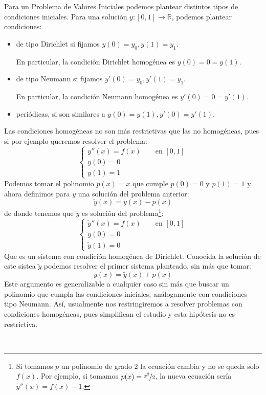 \noindent
Para un Problema de Valores Iniciales podemos plantear distintos tipos de condiciones iniciales. Para una solución $y:[0,1]\to \mathbb{R}$, podemos plantear condiciones:
\begin{itemize}
    \item de tipo Dirichlet si fijamos $y(0) = y_0, y(1) = y_1$.

        En particular, la condición Dirichlet homogénea es $y(0) = 0 = y(1)$.
    \item de tipo Neumann si fijamos $y'(0) = y_0, y'(1) = y_1$.

        En particular, la condición Neumann homogénea es $y'(0) = 0 = y'(1)$.

    \item periódicas, si son similares a $y(0) = y(1), y'(0) = y'(1)$.
\end{itemize}

\begin{observacion}
    Las condiciones homogéneas no son más restrictivas que las no homogéneas, pues si por ejemplo queremos resolver el problema:
    \begin{equation*}
        \left\{\begin{array}{l}
            y''(x) = f(x) \qquad \text{en\ } [0,1] \\
            y(0) = 0 \\
            y(1) = 1
        \end{array}\right.
    \end{equation*}
    Podemos tomar el polinomio $p(x) = x$ que cumple $p(0) = 0$ y $p(1) = 1$ y ahora definimos para $y$ una solución del problema anterior:
    \begin{equation*}
        \tilde{y}(x) = y(x) - p(x)
    \end{equation*}
    de donde tenemos que $\tilde{y}$ es solución del problema\footnote{Si tomamos $p$ un polinomio de grado 2 la ecuación cambia y no se queda solo $f(x)$. Por ejemplo, si tomamos $p(x) = \nicefrac{x^2}{2}$, la nueva ecuación sería $\tilde{y}''(x) = f(x)-1$.}:
    \begin{equation*}
        \left\{\begin{array}{l}
            \tilde{y}''(x) = f(x) \qquad \text{en\ } [0,1] \\
            \tilde{y}(0) = 0 \\
            \tilde{y}(1) = 0 
        \end{array}\right.
    \end{equation*}
    Que es un sistema con condición homogénea de Dirichlet. Conocida la solución de este sistea $\tilde{y}$ podemos resolver el primer sistema planteado, sin más que tomar:
    \begin{equation*}
        y(x) = \tilde{y}(x) + p(x)
    \end{equation*}
    Este argumento es generalizable a cualquier caso sin más que buscar un polinomio que cumpla las condiciones iniciales, análogamente con condiciones tipo Neumann. Así, usualmente nos restringiremos a resolver problemas con condiciones homogéneas, pues simplifican el estudio y esta hipótesis no es restrictiva.
\end{observacion}~\\


